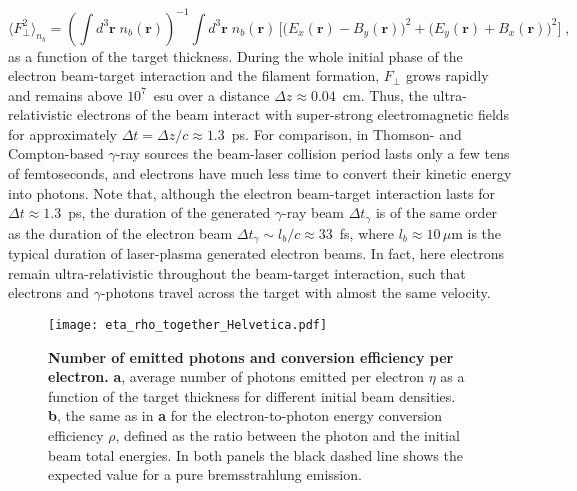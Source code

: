 \documentclass[fleqn,11pt]{wlscirep}
\begin{document}
\begin{equation}
\langle F_\perp^2\rangle_{n_b}=\left(\int d^3\boldsymbol{r} \;n_b(\boldsymbol{r})\right)^{-1}
\displaystyle \int d^3\boldsymbol{r} \;n_b(\boldsymbol{r}) \,\Big[\big(E_x(\boldsymbol{r})-B_y(\boldsymbol{r})\big)^2+\big(E_y(\boldsymbol{r})+B_x(\boldsymbol{r})\big)^2\Big]\;,\label{Fperp_ave_nb}
\end{equation}
as a function of the target thickness. During the whole initial phase of the electron beam-target interaction and the filament formation, $F_\perp$ grows rapidly and remains above $10^7$~esu over a distance $\Delta z\approx 0.04$~cm. 
Thus, the ultra-relativistic electrons of the beam interact with super-strong electromagnetic fields for approximately $\Delta t=\Delta z/c\approx1.3$~ps. 
For comparison, in Thomson- and Compton-based $\gamma$-ray sources the beam-laser collision period lasts only a few tens of femtoseconds, and electrons have much less time to convert their kinetic energy into photons. 
Note that, although the electron beam-target interaction lasts for $\Delta t\approx1.3$~ps, the duration of the generated $\gamma$-ray beam $\Delta t_\gamma$ is of the same order as the duration of the electron beam $\Delta t_\gamma \sim l_b/c\approx 33$~fs, where $l_b\approx10\,\mu$m is the typical duration of laser-plasma generated electron beams. In fact, here electrons remain ultra-relativistic throughout the beam-target interaction, such that electrons and $\gamma$-photons travel across the target with almost the same velocity.  


\begin{figure} %
\centering
\texttt{[image: eta\_rho\_together\_Helvetica.pdf]}
\caption{{\bf Number of emitted photons and conversion efficiency per electron.} \textbf{a}, average number of photons emitted per electron $\eta$ as a function of the target thickness for different initial beam densities. 
\textbf{b}, the same as in \textbf{a} for the electron-to-photon energy conversion efficiency $\rho$, defined as the ratio between the photon and the initial beam total energies. In both panels the black dashed line shows the expected value for a pure bremsstrahlung emission.}
\label{fig:NgEg_norm}
\end{figure}
\end{document}
